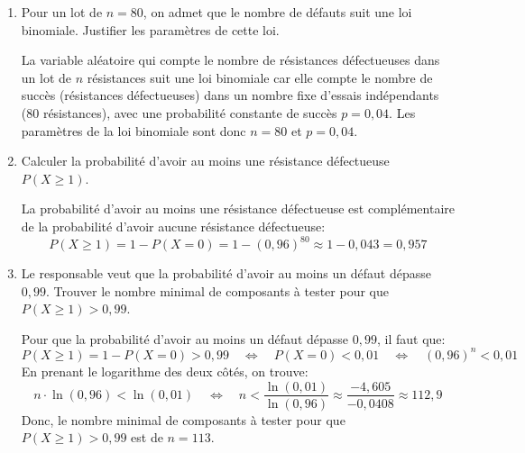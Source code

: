 \documentclass[11pt, a4paper]{report}
\begin{document}
\begin{enumerate}[resume]
    \item Pour un lot de $n = 80$, on admet que le nombre de défauts suit une loi binomiale. Justifier les paramètres de cette loi.
    \begin{blocvisible}[height=5]
        La variable aléatoire qui compte le nombre de résistances défectueuses dans un lot de $n$ résistances suit une loi binomiale car elle compte le nombre de succès (résistances défectueuses) dans un nombre fixe d'essais indépendants (80 résistances), avec une probabilité constante de succès $p = 0,04$. Les paramètres de la loi binomiale sont donc $n = 80$ et $p = 0,04$.
    \end{blocvisible}
    \medskip
\item Calculer la probabilité d'avoir au moins une résistance défectueuse $P(X \geq 1)$.
    \begin{blocvisible}[height=3]
        La probabilité d'avoir au moins une résistance défectueuse est complémentaire de la probabilité d'avoir aucune résistance défectueuse:
        \[P(X \geq 1) = 1 - P(X = 0)= 1 - {(0,96)}^{80} \approx 1 - 0,043 = 0,957\]
    \end{blocvisible}


    \medskip
\item Le responsable veut que la probabilité d'avoir au moins un défaut dépasse $0,99$. Trouver le nombre minimal de composants à tester pour que $P(X \geq 1) > 0,99$.
    \begin{blocvisible}[height=5]
        Pour que la probabilité d'avoir au moins un défaut dépasse $0,99$, il faut que:
        \[P(X \geq 1) = 1 - P(X = 0) > 0,99 \quad \Leftrightarrow \quad P(X = 0) < 0,01 \quad \Leftrightarrow \quad {(0,96)}^{n} < 0,01\]   
        En prenant le logarithme des deux côtés, on trouve:
        \[n \cdot \ln(0,96) < \ln(0,01) \quad \Leftrightarrow \quad n < \frac{\ln(0,01)}{\ln(0,96)} \approx \frac{-4,605}{-0,0408} \approx 112,9\]
        Donc, le nombre minimal de composants à tester pour que $P(X \geq 1) > 0,99$ est de $n = 113$.
    \end{blocvisible}
    \appelprof{}
\end{enumerate}
\end{document}
